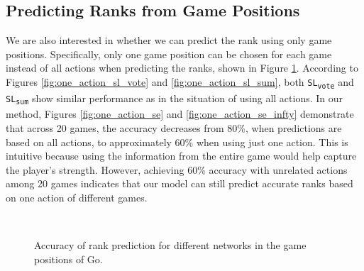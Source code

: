 \subsection{Predicting Ranks from Game Positions}
\label{subsec:preidcion_with_fewer_moves}

We are also interested in whether we can predict the rank using only game positions.
Specifically, only one game position can be chosen for each game instead of all actions when predicting the ranks, shown in Figure \ref{fig:one_action_per_game}. 
According to Figures \ref{fig:one_action_sl_vote} and \ref{fig:one_action_sl_sum}, both \texttt{SL\textsubscript{vote}} and \texttt{SL\textsubscript{sum}} show similar performance as in the situation of using all actions. 
In our method, Figures \ref{fig:one_action_se} and \ref{fig:one_action_se_infty} demonstrate that across 20 games, the accuracy decreases from 80\%, when predictions are based on all actions, to approximately 60\% when using just one action.
This is intuitive because using the information from the entire game would help capture the player's strength. 
However, achieving 60\% accuracy with unrelated actions among 20 games indicates that our model can still predict accurate ranks based on one action of different games.


\begin{figure}[ht]
    \centering
    \\
    \caption{Accuracy of rank prediction for different networks in the game positions of Go.}
    \label{fig:one_action_per_game}
\end{figure}

